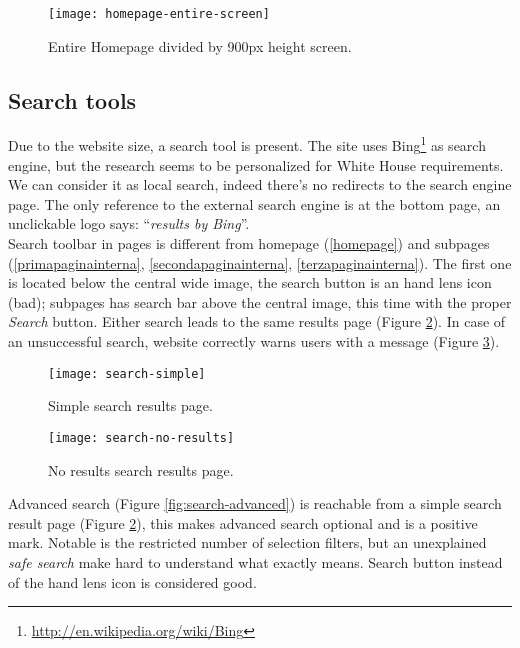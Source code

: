\documentclass[
10pt, %
a4paper, %
oneside, %
headinclude,footinclude, %
BCOR5mm, %
]{scrartcl}
\begin{document}
	\begin{figure}[h]
	\centering 
	\centerline{\texttt{[image: homepage-entire-screen]}}
	\caption[Screen divided homepage]{Entire Homepage divided by 900px height screen.}
	\label{fig:entirehomepage} 
	\end{figure}

	\newpage
	\subsection{Search tools}
	\label{searchtools}
	Due to the website size, a search tool is present. The site uses Bing\footnote{\href{http://en.wikipedia.org/wiki/Bing}{http://en.wikipedia.org/wiki/Bing}} as search engine, but the research seems to be personalized for White House requirements. We can consider it as local search, indeed there's no redirects to the search engine page. The only reference to the external search engine is at the bottom page, an unclickable logo says: ``\emph{results by Bing}''. \\
	Search toolbar in pages is different from homepage (\ref{homepage}) and subpages (\ref{primapaginainterna}, \ref{secondapaginainterna}, \ref{terzapaginainterna}). The first one is located below the central wide image, the search button is an hand lens icon (bad); subpages has search bar above the central image, this time with the proper \emph{Search} button. Either search leads to the same results page (Figure \ref{fig:search-simple}). In case of an unsuccessful search, website correctly warns users with a message (Figure \ref{fig:search-no-results}).

	\begin{figure}[h]
	\centering 
	\centerline{\texttt{[image: search-simple]}}
	\caption[Simple search results page]{Simple search results page.}
	\label{fig:search-simple} 
	\end{figure}

	\begin{figure}[h]
	\centering 
	\centerline{\texttt{[image: search-no-results]}}
	\caption[No results search results page]{No results search results page.}
	\label{fig:search-no-results} 
	\end{figure}

	Advanced search (Figure \ref{fig:search-advanced}) is reachable from a simple search result page (Figure \ref{fig:search-simple}), this makes advanced search optional and is a positive mark. Notable is the restricted number of selection filters, but an unexplained \emph{safe search} make hard to understand what exactly means. Search button instead of the hand lens icon is considered good.
\end{document}
